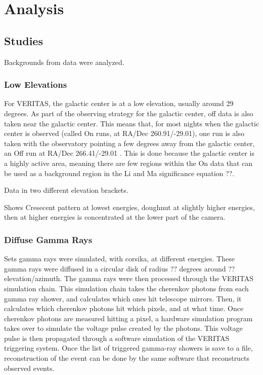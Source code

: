 \cleartooddpage[\thispagestyle{empty}]
\chapter{Analysis}

\section{Studies}
Backgrounds from data were analyzed.

\subsection{Low Elevations}
For VERITAS, the galactic center is at a low elevation, usually around 29 degrees.
As part of the observing strategy for the galactic center, off data is also taken near the galactic center.
This means that, for most nights when the galactic center is observed (called On runs, at RA/Dec 260.91/-29.01), one run is also taken with the observatory pointing a few degrees away from the galactic center, an Off run at RA/Dec 266.41/-29.01 .
This is done because the galactic center is a highly active area, meaning there are few regions within the On data that can be used as a background region in the Li and Ma significance equation ??.

Data in two different elevation brackets.

Shows Cresecent pattern at lowest energies, doughnut at slightly higher energies, then at higher energies is concentrated at the lower part of the camera.

\subsection{Diffuse Gamma Rays}

Sets gamma rays were simulated, with corsika, at different energies.
These gamma rays were diffused in a circular disk of radius ?? degrees around ?? elevation/azimuth.
The gamma rays were then processed through the VERITAS simulation chain.
This simulation chain takes the cherenkov photons from each gamma ray shower, and calculates which ones hit telescope mirrors.
Then, it calculates which cherenkov photons hit which pixels, and at what time.
Once cherenkov photons are measured hitting a pixel, a hardware simulation program takes over to simulate the voltage pulse created by the photons.
This voltage pulse is then propagated through a software simulation of the VERITAS triggering system.
Once the list of triggered gamma-ray showers is save to a file, reconstruction of the event can be done by the same software that reconstructs observed events.

